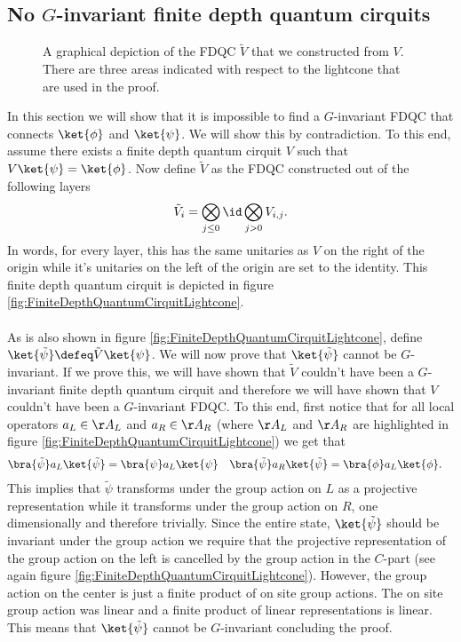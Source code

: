 \subsection{No $G$-invariant finite depth quantum cirquits}
\begin{figure}
	\centering
	\scalebox{0.65}{
		
	}
	\caption{A graphical depiction of the FDQC $\tilde{V}$ that we constructed from $V$. There are three areas indicated with respect to the lightcone that are used in the proof.}	\label{fig:ConnectingPsiAndPsi0Proof2_WithLightcone}
\end{figure}
In this section we will show that it is impossible to find a $G$-invariant FDQC that connects $\ket{\phi}$ and $\ket{\psi}$. We will show this by contradiction. To this end, assume there exists a finite depth quantum cirquit $V$ such that $V\ket{\psi}=\ket{\phi}$. Now define $\tilde{V}$ as the FDQC constructed out of the following layers
\begin{equation}
\tilde{V}_i=\bigotimes_{j\leq 0}\id \bigotimes_{j> 0}V_{i,j}.
\end{equation}
In words, for every layer, this has the same unitaries as $V$ on the right of the origin while it's unitaries on the left of the origin are set to the identity. This finite depth quantum cirquit is depicted in figure \ref{fig:FiniteDepthQuantumCirquitLightcone}.\\\\
As is also shown in figure \ref{fig:FiniteDepthQuantumCirquitLightcone}, define $\ket{\tilde{\psi}}\defeq \tilde{V}\ket{\psi}$. We will now prove that $\ket{\tilde{\psi}}$ cannot be $G$-invariant. If we prove this, we will have shown that $\tilde{V}$ couldn't have been a $G$-invariant finite depth quantum cirquit and therefore we will have shown that $V$ couldn't have been a $G$-invariant FDQC. To this end, first notice that for all local operators $a_L\in\AA_L$ and $a_R\in\AA_R$ (where $\AA_L$ and $\AA_R$ are highlighted in figure \ref{fig:FiniteDepthQuantumCirquitLightcone}) we get that
\begin{align}
\bra{\tilde{\psi}}a_L\ket{\tilde{\psi}}&=\bra{\psi}a_L\ket{\psi}&\bra{\tilde{\psi}}a_R\ket{\tilde{\psi}}&=\bra{\phi}a_L\ket{\phi}.
\end{align}
This implies that $\tilde{\psi}$ transforms under the group action on $L$ as a projective representation while it transforms under the group action on $R$, one dimensionally and therefore trivially. Since the entire state, $\ket{\tilde{\psi}}$ should be invariant under the group action we require that the projective representation of the group action on the left is cancelled by the group action in the $C$-part (see again figure \ref{fig:FiniteDepthQuantumCirquitLightcone}). However, the group action on the center is just a finite product of on site group actions. The on site group action was linear and a finite product of linear representations is linear. This means that $\ket{\tilde{\psi}}$ cannot be $G$-invariant concluding the proof.
